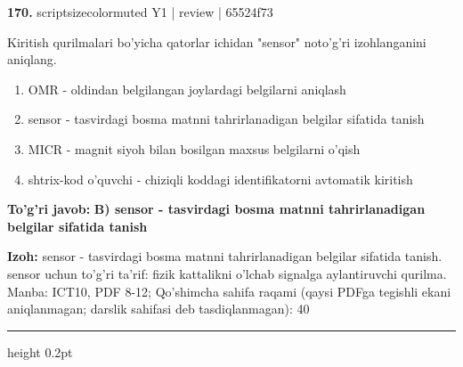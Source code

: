 \documentclass[10pt,a4paper]{article}
\begin{document}
{\bfseries\sffamily\color{ink} 170.} {scriptsizecolor{muted} Y1 | review | 65524f73}
\par
Kiritish qurilmalari bo'yicha qatorlar ichidan "sensor" noto'g'ri izohlanganini aniqlang.
\begin{enumerate}[label=\Alph*),leftmargin=9mm]
\item OMR - oldindan belgilangan joylardagi belgilarni aniqlash
\item sensor - tasvirdagi bosma matnni tahrirlanadigan belgilar sifatida tanish
\item MICR - magnit siyoh bilan bosilgan maxsus belgilarni o'qish
\item shtrix-kod o'quvchi - chiziqli koddagi identifikatorni avtomatik kiritish
\end{enumerate}
\begin{tcolorbox}[enhanced,breakable,colback=teal!4,colframe=teal!60!black,boxrule=0.45pt,arc=1.2mm,left=2.7mm,right=2.7mm,top=1.8mm,bottom=1.8mm,before skip=2mm,after skip=2mm]
{\bfseries\sffamily\color{teal}To'g'ri javob:} \textbf{B) sensor - tasvirdagi bosma matnni tahrirlanadigan belgilar sifatida tanish}
\par\smallskip
{\bfseries Izoh:} sensor - tasvirdagi bosma matnni tahrirlanadigan belgilar sifatida tanish. sensor uchun to'g'ri ta'rif: fizik kattalikni o'lchab signalga aylantiruvchi qurilma. Manba: ICT10, PDF 8-12; Qo'shimcha sahifa raqami (qaysi PDFga tegishli ekani aniqlanmagan; darslik sahifasi deb tasdiqlanmagan): 40
\end{tcolorbox}
\vspace{2mm}\hrule height 0.2pt\vspace{3mm}
\end{document}
